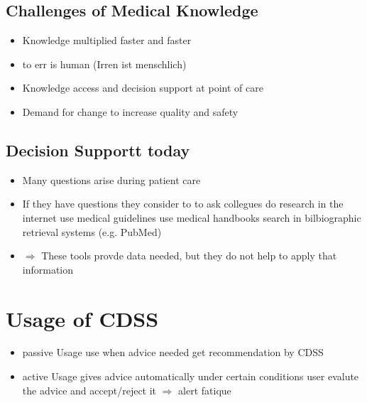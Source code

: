 \documentclass{report}
\theoremstyle{definition}
\theoremstyle{example}
\begin{document}
\subsection{Challenges of Medical Knowledge}
\begin{itemize}
   \item Knowledge multiplied faster and faster
   \item to err is human (Irren ist menschlich)
   \item Knowledge access and decision support at point of care
   \item Demand for change to increase quality and safety
\end{itemize}

\subsection{Decision Supportt today}
\begin{itemize}
   \item Many questions arise during patient care
   \item If they have questions they consider to
   \subitem to ask collegues
   \subitem do research in the internet
   \subitem use medical guidelines
   \subitem use medical handbooks
   \subitem search in bilbiographic retrieval systems (e.g. PubMed)
   \item $\Rightarrow$ These tools provde data needed, but they do not help to apply that information 
\end{itemize}

\section{Usage of CDSS}
\begin{itemize}
   \item passive Usage
   \subitem use when advice needed
   \subitem get recommendation by CDSS 
   \item active Usage
   \subitem gives advice automatically under certain conditions
   \subitem user evalute the advice and accept/reject it
   \subitem $\Rightarrow$ alert fatique 
\end{itemize}
\end{document}
